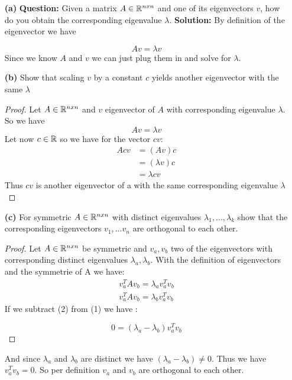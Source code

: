 
\begin{itemize}
    
\item[\textbf{(a)}] \textbf{Question:} Given a matrix $A \in \mathbb{R}^{nxn}$ and one of its eigenvectors $v$, how do you obtain the corresponding eigenvalue $\lambda$.
\newline
\textbf{Solution:} By definition of the eigenvector we have

\[
Av=\lambda v    
\]
Since we know $A$ and $v$ we can just plug them in and solve for $\lambda$.

\item[\textbf{(b)}] Show that scaling $v$ by a constant $c$ yields another eigenvector with the same $\lambda$
\begin{proof}
    Let $A \in \mathbb{R}^{nxn}$ and $v$ eigenvector of $A$ with corresponding eigenvalue $\lambda$. So we have 
\[
Av=\lambda v    
\]
Let now $c \in \mathbb{R}$ so we have for the vector $cv$:
\begin{align*}
    Acv  &= (Av)c\\
        &=(\lambda v)c\\
        &=\lambda cv
\end{align*}
Thus $cv$ is another eigenvector of a with the same corresponding eigenvalue $\lambda$
\end{proof}   
\item[\textbf{(c)}]
For symmetric $A \in \mathbb{R}^{nxn}$ with distinct eigenvalues $\lambda_1,...,\lambda_k$ show that the corresponding eigenvectors $v_1,...v_n$ are orthogonal to each other.

\begin{proof}
    Let $A \in \mathbb{R}^{nxn}$ be symmetric and $v_a, v_b$ two of the  eigenvectors with corresponding distinct eigenvalues $\lambda_a, \lambda_b$. With the definition of eigenvectors and the symmetrie of A we have:
    \begin{align}
        v_a^TAv_b=\lambda_a v_a^Tv_b \\
        v_a^TAv_b=\lambda_b v_a^Tv_b
    \end{align}
If we subtract (2) from (1) we have :

\[
0= (\lambda_a -\lambda_b)   v_a^Tv_b
\]
\end{proof}
And since $\lambda_a$ and $\lambda_b$ are distinct we have $(\lambda_a -\lambda_b) \neq 0$. Thus we have $v_a^Tv_b=0$. So per definition $v_a$ and $v_b$ are orthogonal to each other.
\end{itemize}